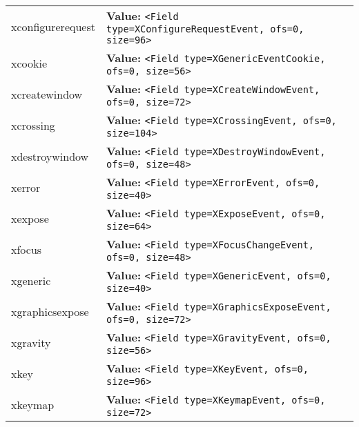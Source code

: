 \begin{longtable}{|p{\varnamewidth}|p{\vardescrwidth}|l}
\cline{1-2}
\raggedright x\-c\-o\-n\-f\-i\-g\-u\-r\-e\-r\-e\-q\-u\-e\-s\-t\- & \raggedright \textbf{Value:} 
{\tt {\textless}Field type=XConfigureRequestEvent, ofs=0, size=96{\textgreater}}&\\
\cline{1-2}
\raggedright x\-c\-o\-o\-k\-i\-e\- & \raggedright \textbf{Value:} 
{\tt {\textless}Field type=XGenericEventCookie, ofs=0, size=56{\textgreater}}&\\
\cline{1-2}
\raggedright x\-c\-r\-e\-a\-t\-e\-w\-i\-n\-d\-o\-w\- & \raggedright \textbf{Value:} 
{\tt {\textless}Field type=XCreateWindowEvent, ofs=0, size=72{\textgreater}}&\\
\cline{1-2}
\raggedright x\-c\-r\-o\-s\-s\-i\-n\-g\- & \raggedright \textbf{Value:} 
{\tt {\textless}Field type=XCrossingEvent, ofs=0, size=104{\textgreater}}&\\
\cline{1-2}
\raggedright x\-d\-e\-s\-t\-r\-o\-y\-w\-i\-n\-d\-o\-w\- & \raggedright \textbf{Value:} 
{\tt {\textless}Field type=XDestroyWindowEvent, ofs=0, size=48{\textgreater}}&\\
\cline{1-2}
\raggedright x\-e\-r\-r\-o\-r\- & \raggedright \textbf{Value:} 
{\tt {\textless}Field type=XErrorEvent, ofs=0, size=40{\textgreater}}&\\
\cline{1-2}
\raggedright x\-e\-x\-p\-o\-s\-e\- & \raggedright \textbf{Value:} 
{\tt {\textless}Field type=XExposeEvent, ofs=0, size=64{\textgreater}}&\\
\cline{1-2}
\raggedright x\-f\-o\-c\-u\-s\- & \raggedright \textbf{Value:} 
{\tt {\textless}Field type=XFocusChangeEvent, ofs=0, size=48{\textgreater}}&\\
\cline{1-2}
\raggedright x\-g\-e\-n\-e\-r\-i\-c\- & \raggedright \textbf{Value:} 
{\tt {\textless}Field type=XGenericEvent, ofs=0, size=40{\textgreater}}&\\
\cline{1-2}
\raggedright x\-g\-r\-a\-p\-h\-i\-c\-s\-e\-x\-p\-o\-s\-e\- & \raggedright \textbf{Value:} 
{\tt {\textless}Field type=XGraphicsExposeEvent, ofs=0, size=72{\textgreater}}&\\
\cline{1-2}
\raggedright x\-g\-r\-a\-v\-i\-t\-y\- & \raggedright \textbf{Value:} 
{\tt {\textless}Field type=XGravityEvent, ofs=0, size=56{\textgreater}}&\\
\cline{1-2}
\raggedright x\-k\-e\-y\- & \raggedright \textbf{Value:} 
{\tt {\textless}Field type=XKeyEvent, ofs=0, size=96{\textgreater}}&\\
\cline{1-2}
\raggedright x\-k\-e\-y\-m\-a\-p\- & \raggedright \textbf{Value:} 
{\tt {\textless}Field type=XKeymapEvent, ofs=0, size=72{\textgreater}}&\\

\end{longtable}
